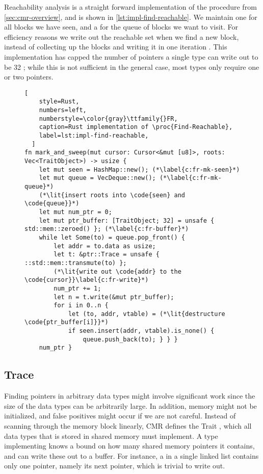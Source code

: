 Reachability analysis is a straight forward implementation of the  procedure
from \cref{sec:cmr-overview}, and is shown in \cref{lst:impl-find-reachable}. We maintain one
  for all blocks we have seen, and a 
 for the queue of blocks we want to visit. For efficiency reasons
we write out the reachable set when we find a new block, instead of collecting up the blocks and
writing it in one iteration . This implementation has capped the
number of pointers a single type can write out to be 32 ; while this
is not sufficient in the general case, most types only require one or two pointers.



\begin{figure}[ht]
  \begin{lstlisting}[
    style=Rust,
    numbers=left,
    numberstyle=\color{gray}\ttfamily{}FR,
    caption=Rust implementation of \proc{Find-Reachable},
    label=lst:impl-find-reachable,
  ]
fn mark_and_sweep(mut cursor: Cursor<&mut [u8]>, roots: Vec<TraitObject>) -> usize {
    let mut seen = HashMap::new(); (*\label{c:fr-mk-seen}*)
    let mut queue = VecDeque::new(); (*\label{c:fr-mk-queue}*)
    (*\lit{insert roots into \code{seen} and \code{queue}}*)
    let mut num_ptr = 0;
    let mut ptr_buffer: [TraitObject; 32] = unsafe { std::mem::zeroed() }; (*\label{c:fr-buffer}*)
    while let Some(to) = queue.pop_front() {
        let addr = to.data as usize;
        let t: &ptr::Trace = unsafe { ::std::mem::transmute(to) };
        (*\lit{write out \code{addr} to the \code{cursor}}\label{c:fr-write}*)
        num_ptr += 1;
        let n = t.write(&mut ptr_buffer);
        for i in 0..n {
            let (to, addr, vtable) = (*\lit{destructure \code{ptr_buffer[i]}}*)
            if seen.insert(addr, vtable).is_none() {
                queue.push_back(to); } } }
    num_ptr }
\end{lstlisting}
\end{figure}


\subsection{Trace\label{sec:impl-trace}}

Finding pointers in arbitrary data types might involve significant work since the size of the data
types can be arbitrarily large. In addition, memory might not be initialized, and false positives
might occur if we are not careful. Instead of scanning through the memory block linearly, CMR
defines the Trait , which all data types that is stored in shared memory must
implement.  A type implementing  knows a bound on how many shared memory pointers it
contains, and can write these out to a buffer. For instance, a  in a single linked list
contains only one pointer, namely its next pointer, which is trivial to write out.

